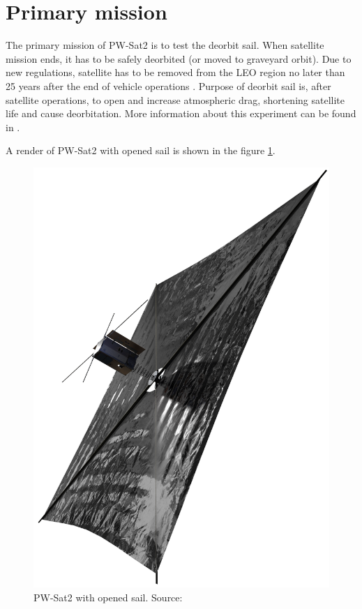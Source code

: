     \section{Primary mission}
        The primary mission of PW-Sat2 is to test the deorbit sail. When satellite mission ends, it has to be safely deorbited (or moved to graveyard orbit). Due to new regulations, satellite has to be removed from
        the LEO region no later than 25 years after the end of vehicle operations \cite{Satellite_disposal}. Purpose of deorbit sail is, after satellite operations, to open and increase atmospheric drag, shortening satellite life and cause deorbitation. More information about this experiment can be found in \cite{DDC_article}.

        A render of PW-Sat2 with opened sail is shown in the figure \ref{PW-Sat_render_sail}.

        \begin{figure}[H]
            \centering
            \includegraphics[width=0.38\paperwidth]{img/1/PW-Sat2_render_02.png}
            \caption{PW-Sat2 with opened sail. Source: \cite{PW_sat2_photo}}
            \label{PW-Sat_render_sail}
        \end{figure}

